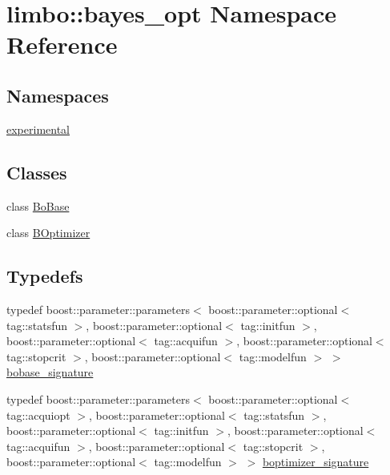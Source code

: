 \hypertarget{namespacelimbo_1_1bayes__opt}{}\section{limbo\+:\+:bayes\+\_\+opt Namespace Reference}
\label{namespacelimbo_1_1bayes__opt}
\subsection*{Namespaces}
\begin{DoxyCompactItemize}
\item 
 \hyperlink{namespacelimbo_1_1bayes__opt_1_1experimental}{experimental}
\end{DoxyCompactItemize}
\subsection*{Classes}
\begin{DoxyCompactItemize}
\item 
class \hyperlink{classlimbo_1_1bayes__opt_1_1_bo_base}{Bo\+Base}
\item 
class \hyperlink{classlimbo_1_1bayes__opt_1_1_b_optimizer}{B\+Optimizer}
\end{DoxyCompactItemize}
\subsection*{Typedefs}
\begin{DoxyCompactItemize}
\item 
typedef boost\+::parameter\+::parameters$<$ boost\+::parameter\+::optional$<$ tag\+::statsfun $>$, boost\+::parameter\+::optional$<$ tag\+::initfun $>$, boost\+::parameter\+::optional$<$ tag\+::acquifun $>$, boost\+::parameter\+::optional$<$ tag\+::stopcrit $>$, boost\+::parameter\+::optional$<$ tag\+::modelfun $>$ $>$ \hyperlink{namespacelimbo_1_1bayes__opt_a1edab117064bc665b2c743c0f3614479}{bobase\+\_\+signature}
\item 
typedef boost\+::parameter\+::parameters$<$ boost\+::parameter\+::optional$<$ tag\+::acquiopt $>$, boost\+::parameter\+::optional$<$ tag\+::statsfun $>$, boost\+::parameter\+::optional$<$ tag\+::initfun $>$, boost\+::parameter\+::optional$<$ tag\+::acquifun $>$, boost\+::parameter\+::optional$<$ tag\+::stopcrit $>$, boost\+::parameter\+::optional$<$ tag\+::modelfun $>$ $>$ \hyperlink{namespacelimbo_1_1bayes__opt_aef2e9f6b642760d428c30abd9d12a61e}{boptimizer\+\_\+signature}
\end{DoxyCompactItemize}


